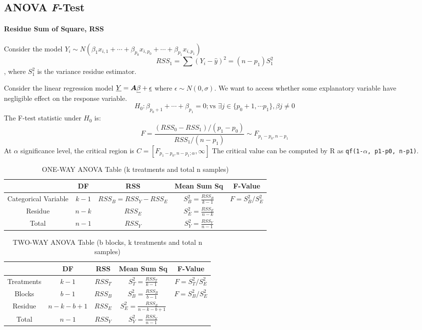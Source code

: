 \documentclass[10pt]{article}
\begin{document}
\subsection{ANOVA \textit{F}-Test}
\paragraph{Residue Sum of Square, RSS}
Consider the model $Y_i \sim N(\beta_1x_{i,1}+\cdots+\beta_{p_0}x_{i, p_0}+\cdots+ \beta_{p_1}x_{i, p_1})$
\[RSS_1=\sum (Y_i-\hat{y})^2=(n-p_1)S^2_1\], where $S^2_1$ is the variance residue estimator.
\begin{definition}
	Consider the linear regression model $\underline{Y} = \bm{A} \underline{\beta}+\underline{\epsilon}$ where $\epsilon \sim N(0, \sigma) $. 
	We want to access whether some explanatory variable have negligible effect on the response variable.
	\[H_0: \beta_{p_0+1} + \cdots + \beta_{p_1}=0; \text{vs } \exists j \in \{p_{0}+1, \cdots p_1\}, \beta j \neq 0 \]
	The F-test statistic under $H_0$ is:
	\[F=\frac{(RSS_0-RSS_1)/(p_1-p_0)}{RSS_1/(n-p_1)} \sim F_{p_1-p_0, n-p_1}\]
	At $\alpha$ significance level, the critical region is $C=[F_{p_1-p_0, n-p_1; \alpha}, \infty]$
	The critical value can be computed by R as \texttt{qf(1-$\alpha$, p1-p0, n-p1)}.
\end{definition}

\begin{table}[ht]
	\centering
	\caption{ONE-WAY ANOVA Table (k treatments and total n samples)}
	\begin{tabular}{|c|c|c|c|c|}
			 & DF & RSS & Mean Sum Sq & F-Value \\
			\hline
			Categorical Variable & $k-1$ & $RSS_B=RSS_Y-RSS_E$ & $S^2_B=\frac{RSS_B}{k-1}$ & $F=S^2_B/S^2_E$\\
			Residue & $n-k$ & $RSS_E$ & $S_E^2=\frac{RSS_E}{n-k}$ & \\
			Total & $n-1$ & $RSS_Y$ & $S_Y^2=\frac{RSS_Y}{n-1}$& \\
	\end{tabular}
\end{table}

\begin{table}[ht]
	\centering
	\caption{TWO-WAY ANOVA Table (b blocks, k treatments and total n samples)}
	\begin{tabular}{|c|c|c|c|c|}
			 & DF & RSS & Mean Sum Sq & F-Value \\
			\hline
			Treatments & $k-1$ & $RSS_T$& $S^2_T=\frac{RSS_T}{k-1}$ & $F=S^2_T/S^2_E$\\
			Blocks & $b-1$ & $RSS_B$ & $S_B^2=\frac{RSS_B}{b-1}$ & $F=S^2_B/S^2_E$\\
			Residue & $n-k-b+1$ & $RSS_E$ & $S_E^2=\frac{RSS_E}{n-k-b+1}$ & \\
			Total & $n-1$ & $RSS_Y$ & $S_Y^2=\frac{RSS_Y}{n-1}$& \\
	\end{tabular}
\end{table}
\end{document}
